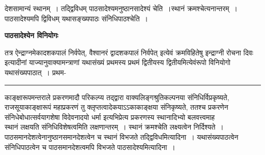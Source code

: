 \documentclass[11pt, openany]{book}
\begin{document}
{\bl देशसामान्यं स्थानम्~। तद्द्विविधम् पाठसादेश्यमनुष्ठानसादेश्यं चेति~।स्थानं क्रमश्चेत्यनान्तरम्~। पाठसादेश्यमपि द्विविधम् {\al यथासङ्ख्यपाठः संनिधिपाठश्चेति~}।~}
\begin{center}
\textbf{पाठसादेश्येन विनियोगः }    
\end{center}

{\bl तत्र {\qtl ऐन्द्राग्नमेकादशकपालं निर्वपेत्, वैश्वानरं द्वादशकपालं निर्वपेत्} इत्येवं क्रमविहितेषु {\qtl इन्द्राग्नी रोचना दिवः} इत्यादीनां याज्यानुवाक्यामन्त्राणां यथासंख्यं प्रथमस्य प्रथमं द्वितीयस्य द्वितीयमित्येवंरूपो विनियोगो यथासंख्यपाठात्~। प्रथम-\\} 
\hrule
\vspace{3mm}
\noindent
काङ्क्षारूपमन्तराले प्रकरणमादौ परिकल्प्य तद्द्वारा वाक्यलिङ्गश्रुतिकल्पनया संनिधिर्विप्रकृष्यते, राजसूयाकाङ्क्षारूपं महाप्रकरणं तु क्लृप्तत्वादेकयाऽऽकाकाङ्क्षया संनिकृष्यते, ततश्च प्रकरणेन संनिधेबोधात्सर्वयागशेषा विदेवनादयो धर्मा इत्यभिप्रेत्य प्रकरणस्य स्थानादिभ्यो बलवत्त्वमाह \\

 स्थानं लक्षयति संनिधिविशेषत्वमिति लक्षणान्तरम्~। स्थानं क्रमश्चेति लक्ष्यत्वेन निर्दिश्यते~। पाठसमानदेशत्वेनानुष्ठानसमानदेशत्वेन च स्थानं विभजते {\br तद्द्विविधमित्यादिना~।} यथासंख्यपाठत्वेन संनिधिपाठत्वेन च पाठसमानदेशत्वमपि विभजते {\br पाठसादेश्यमित्यादिना~।}\\
\end{document}
